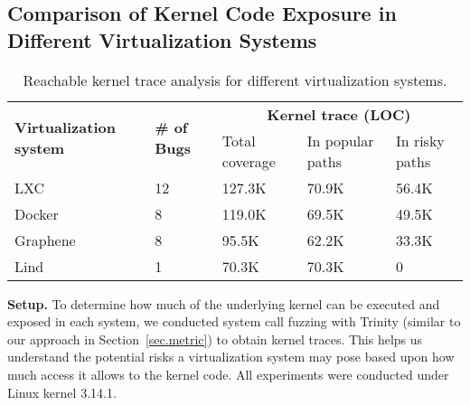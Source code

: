 {{{\begin{table}[h]
\label{table:trigger_vulnerabilities}
\end{table}

\subsection{Comparison of Kernel Code Exposure in Different Virtualization
Systems}
\label{Reachable-Kernel-Trace-Analysis-for-Different-Virtualization-Systems}
\begin{table}
\centering
\scriptsize
\begin{tabular}{|l|l|l|l|l|}
  \hline
  \multirow{3}{1.5cm}{\bf Virtualization system} & \multirow{3}{0.5cm}{\bf \# of Bugs} & \multicolumn{3}{c|}{\bf Kernel trace (LOC)} \\ \cline{3-5}
  & & \multirow{2}{1.2cm}{Total coverage} & \multirow{2}{1.2cm}{In popular paths} & \multirow{2}{1.2cm}{In risky paths}  \\
  & & & & \\  \hline
  LXC & 12 & 127.3K & 70.9K & 56.4K \\
  \hline
  Docker & 8 & 119.0K & 69.5K & 49.5K \\
  \hline
  Graphene & 8 & 95.5K & 62.2K & 33.3K \\
  \hline
  Lind & 1 & 70.3K & 70.3K & 0 \\
  \hline
\end{tabular}
\caption{\small Reachable kernel trace analysis for different virtualization
systems.}
\label{table:trace-systems}
\end{table}


\noindent
\textbf{Setup.}
To determine how much of the underlying kernel can be executed and exposed in
each system,
we conducted system call fuzzing with Trinity (similar to our approach in
Section~{\ref{sec.metric}}) to obtain
kernel traces. This helps us understand the potential risks a virtualization system
may pose based upon how much access it allows to the kernel code.
All experiments were conducted under Linux kernel 3.14.1.

}}}
